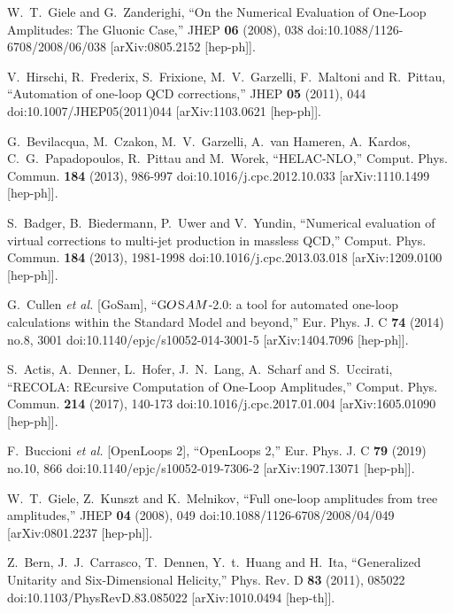 W.~T.~Giele and G.~Zanderighi,
``On the Numerical Evaluation of One-Loop Amplitudes: The Gluonic Case,''
JHEP \textbf{06} (2008), 038
doi:10.1088/1126-6708/2008/06/038
[arXiv:0805.2152 [hep-ph]].

V.~Hirschi, R.~Frederix, S.~Frixione, M.~V.~Garzelli, F.~Maltoni and R.~Pittau,
``Automation of one-loop QCD corrections,''
JHEP \textbf{05} (2011), 044
doi:10.1007/JHEP05(2011)044
[arXiv:1103.0621 [hep-ph]].

G.~Bevilacqua, M.~Czakon, M.~V.~Garzelli, A.~van Hameren, A.~Kardos, C.~G.~Papadopoulos, R.~Pittau and M.~Worek,
``HELAC-NLO,''
Comput. Phys. Commun. \textbf{184} (2013), 986-997
doi:10.1016/j.cpc.2012.10.033
[arXiv:1110.1499 [hep-ph]].

S.~Badger, B.~Biedermann, P.~Uwer and V.~Yundin,
``Numerical evaluation of virtual corrections to multi-jet production in massless QCD,''
Comput. Phys. Commun. \textbf{184} (2013), 1981-1998
doi:10.1016/j.cpc.2013.03.018
[arXiv:1209.0100 [hep-ph]].

G.~Cullen \textit{et al.} [GoSam],
``G$\scriptsize{O}$S$\scriptsize{AM}$-2.0: a tool for automated one-loop calculations within the Standard Model and beyond,''
Eur. Phys. J. C \textbf{74} (2014) no.8, 3001
doi:10.1140/epjc/s10052-014-3001-5
[arXiv:1404.7096 [hep-ph]].

S.~Actis, A.~Denner, L.~Hofer, J.~N.~Lang, A.~Scharf and S.~Uccirati,
``RECOLA: REcursive Computation of One-Loop Amplitudes,''
Comput. Phys. Commun. \textbf{214} (2017), 140-173
doi:10.1016/j.cpc.2017.01.004
[arXiv:1605.01090 [hep-ph]].

F.~Buccioni \textit{et al.} [OpenLoops 2],
``OpenLoops 2,''
Eur. Phys. J. C \textbf{79} (2019) no.10, 866
doi:10.1140/epjc/s10052-019-7306-2
[arXiv:1907.13071 [hep-ph]].

W.~T.~Giele, Z.~Kunszt and K.~Melnikov,
``Full one-loop amplitudes from tree amplitudes,''
JHEP \textbf{04} (2008), 049
doi:10.1088/1126-6708/2008/04/049
[arXiv:0801.2237 [hep-ph]].

Z.~Bern, J.~J.~Carrasco, T.~Dennen, Y.~t.~Huang and H.~Ita,
``Generalized Unitarity and Six-Dimensional Helicity,''
Phys. Rev. D \textbf{83} (2011), 085022
doi:10.1103/PhysRevD.83.085022
[arXiv:1010.0494 [hep-th]].

